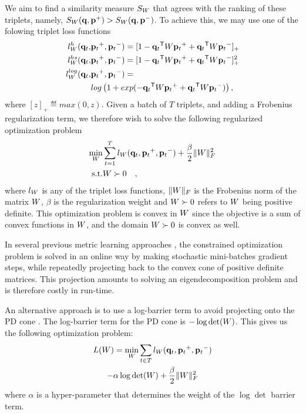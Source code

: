 \documentclass{article}
\begin{document}
We aim to find a similarity measure $S_{{W}}$ that agrees with the ranking of these triplets, namely, $S_{{W}}({\mathbf{q}}, {\mathbf{p}}^{+}) > S_{{W}}({\mathbf{q}},
{\mathbf{p}}^{-})$. To achieve this, we may use one of the folowing triplet loss functions
\begin{align}
\label{single-triplet-hinge-loss}
l_{{W}}^h({{\mathbf{q}}_{{t}}}, &{{\mathbf{p}}_{{t}}}^{+}, {{\mathbf{p}}_{{t}}}^{-}) = [1-{{\mathbf{q}}_{{t}}}{}^\mathsf{T}{W}{{\mathbf{p}}_{{t}}}^+ + {{\mathbf{q}}_{{t}}}{}^\mathsf{T}{W}{{\mathbf{p}}_{{t}}}^-]_{+}
 \\ \nonumber
 \label{single-triplet-hinge-loss2}
l_{{W}}^{hs}({{\mathbf{q}}_{{t}}}, &{{\mathbf{p}}_{{t}}}^+, {{\mathbf{p}}_{{t}}}^-) = [1-{{\mathbf{q}}_{{t}}}{}^\mathsf{T}{W}{{\mathbf{p}}_{{t}}}^+ + {{\mathbf{q}}_{{t}}}{}^\mathsf{T}{W}{{\mathbf{p}}_{{t}}}^-]_{+}^2
 \\ \nonumber
 \label{single-triplet-log-loss} 
l_{{W}}^{log}({{\mathbf{q}}_{{t}}}, &{{\mathbf{p}}_{{t}}}^+, {{\mathbf{p}}_{{t}}}^-) = \\ 
&log\left(1+exp(-{{\mathbf{q}}_{{t}}}{}^\mathsf{T}{W}{{\mathbf{p}}_{{t}}}^+ + {{\mathbf{q}}_{{t}}}{}^\mathsf{T}{W}{{\mathbf{p}}_{{t}}}^-)\right) \nonumber ,
\end{align}
where $[z]_{+} \eqdef max(0,z)$.  Given a batch of $T$ triplets, and adding a Frobenius regularization term, we therefore wish to solve the following regularized optimization problem
\begin{eqnarray}
  \min_{{W}}& \sum_{{t}=1}^T  l_{{W}}({{\mathbf{q}}_{{t}}}, {{\mathbf{p}}_{{t}}}^+, {{\mathbf{p}}_{{t}}}^-) + \frac{\beta}{2} {\|{W}\|_F^2}
 \\  \nonumber
   \rm{s.t.}& {W} \succ 0 \quad,
  \label{hingelt}
\end{eqnarray}
where $l_{{W}}$ is any of the triplet loss functions, ${\|{W}\|_F}$ is the Frobenius norm of the matrix ${W}$, $\beta$ is the regularization weight and ${W} \succ 0$ refers to ${W}$ being positive definite. This optimization problem is convex in ${W}$ since the objective is a sum of convex functions in ${W}$, and the domain ${W} \succ 0$ is convex as well.

In several previous metric learning approaches \cite{qianHD, qian}, the constrained optimization problem is solved in an online way by making stochastic mini-batches gradient steps, while repeatedly projecting back to the convex cone of positive definite matrices. This projection amounts to solving an eigendecomposition problem and is therefore costly in run-time.

An alternative approach is to use a log-barrier term to avoid projecting onto the PD cone \cite{davis2007information,lego}. The log-barrier term for the PD cone is $- \log \det ({W})$. This gives us the following optimization problem:
\begin{multline}
\label{eq-logdet-loss}
  L(W) = 
  \min_{{W}} \sum_{{t} \in T}  l_{{W}}({{\mathbf{q}}_{{t}}}, {{\mathbf{p}}_{{t}}}^+, {{\mathbf{p}}_{{t}}}^-) \\ 
  - \alpha \log \det({W}) + \frac{\beta}{2} {\|{W}\|_F^2}
\end{multline}
where $\alpha$ is a hyper-parameter that determines the weight of the
$\log \det$ barrier term.
\end{document}
